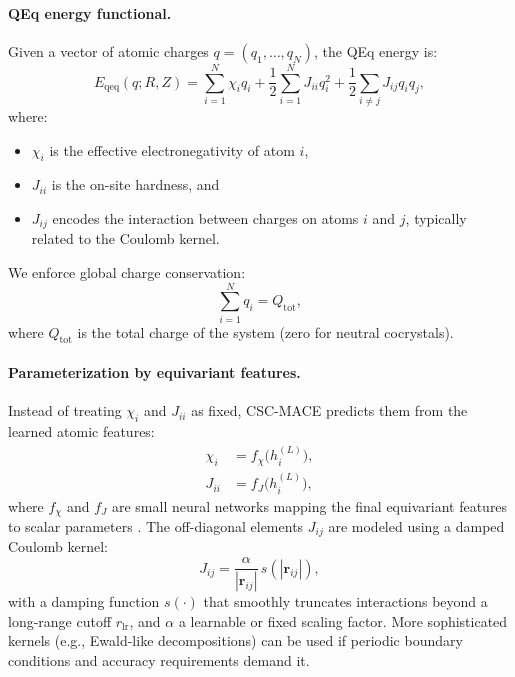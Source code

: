 \documentclass{article}
\begin{document}
\paragraph{QEq energy functional.}
Given a vector of atomic charges $q = (q_1, \dots, q_N)$, the QEq energy is:
\begin{equation}
    E_{\text{qeq}}(q; R, Z) = \sum_{i=1}^{N} \chi_i q_i + \frac{1}{2} \sum_{i=1}^{N} J_{ii} q_i^2 + \frac{1}{2} \sum_{i \neq j} J_{ij} q_i q_j,
    \label{eq:qeq_energy}
\end{equation}
where:
\begin{itemize}
    \item $\chi_i$ is the effective electronegativity of atom $i$,
    \item $J_{ii}$ is the on-site hardness, and
    \item $J_{ij}$ encodes the interaction between charges on atoms $i$ and $j$, typically related to the Coulomb kernel.
\end{itemize}

We enforce global charge conservation:
\begin{equation}
    \sum_{i=1}^{N} q_i = Q_{\text{tot}},
\end{equation}
where $Q_{\text{tot}}$ is the total charge of the system (zero for neutral cocrystals).

\paragraph{Parameterization by equivariant features.}
Instead of treating $\chi_i$ and $J_{ii}$ as fixed, CSC-MACE predicts them from the learned atomic features:
\begin{align}
    \chi_i &= f_\chi\big(h_i^{(L)}\big), \\
    J_{ii} &= f_J\big(h_i^{(L)}\big),
\end{align}
where $f_\chi$ and $f_J$ are small neural networks mapping the final equivariant features to scalar parameters \cite{ko2021fourth}. The off-diagonal elements $J_{ij}$ are modeled using a damped Coulomb kernel:
\begin{equation}
    J_{ij} = \frac{\alpha}{|\mathbf{r}_{ij}|} \, s(|\mathbf{r}_{ij}|),
\end{equation}
with a damping function $s(\cdot)$ that smoothly truncates interactions beyond a long-range cutoff $r_{\text{lr}}$, and $\alpha$ a learnable or fixed scaling factor. More sophisticated kernels (e.g., Ewald-like decompositions) can be used if periodic boundary conditions and accuracy requirements demand it.
\end{document}
